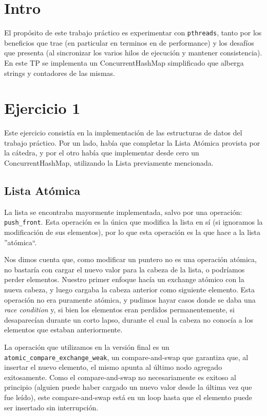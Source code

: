 \section{Intro}

El propósito de este trabajo práctico es experimentar con \texttt{pthreads}, tanto por los beneficios que trae (en particular en terminos en de performance) y los desafíos que presenta (al sincronizar los varios hilos de ejecución y mantener consistencia). En este TP se implementa un ConcurrentHashMap simplificado que alberga strings y contadores de las mismas.

\section{Ejercicio 1}

Este ejercicio consistía en la implementación de las estructuras de datos del trabajo práctico. Por un lado, había que completar la Lista Atómica provista por la cátedra, y por el otro había que implementar desde cero un ConcurrentHashMap, utilizando la Lista previamente mencionada.

\subsection{Lista Atómica}

La lista se encontraba mayormente implementada, salvo por una operación: \texttt{push\_front}. Esta operación es la única que modifica la lista en sí (si ignoramos la modificación de sus elementos), por lo que esta operación es la que hace a la lista ''atómica``.

Nos dimos cuenta que, como modificar un puntero no es una operación atómica, no bastaría con cargar el nuevo valor para la cabeza de la lista, o podríamos perder elementos. Nuestro primer enfoque hacía un exchange atómico con la nueva cabeza, y luego cargaba la cabeza anterior como siguiente elemento. Esta operación no era puramente atómica, y pudimos hayar casos donde se daba una \textit{race condition} y, si bien los elementos eran perdidos permanentemente, si desaparecían durante un corto lapso, durante el cual la cabeza no conocía a los elementos que estaban anteriormente.

La operación que utilizamos en la versión final es un \texttt{atomic\_compare\_exchange\_weak}, un compare-and-swap que garantiza que, al insertar el nuevo elemento, el mismo apunta al último nodo agregado exitosamente. Como el compare-and-swap no necesariamente es exitoso al principio (alguien puede haber cargado un nuevo valor desde la última vez que fue leído), este compare-and-swap está en un loop hasta que el elemento puede ser insertado sin interrupción.


